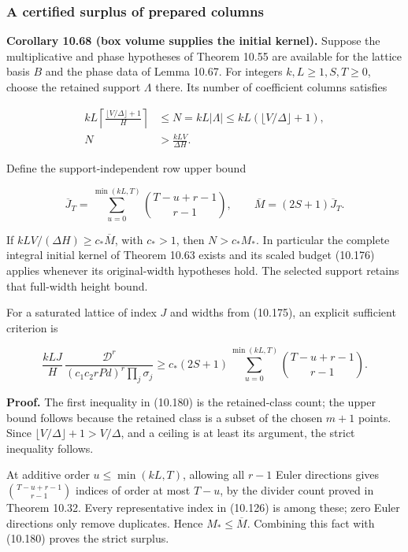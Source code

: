 \documentclass[
  11pt,
  a4paper,
]{article}
\begin{document}
\subsubsection{A certified surplus of prepared
columns}\label{a-certified-surplus-of-prepared-columns}

\textbf{Corollary 10.68 (box volume supplies the initial kernel).}
Suppose the multiplicative and phase hypotheses of Theorem 10.55 are
available for the lattice basis \(B\) and the phase data of Lemma 10.67.
For integers \(k,L\ge1,S,T\ge0\), choose the retained support
\(\Lambda\) there. Its number of coefficient columns satisfies

\[
\begin{aligned}
kL\left\lceil\frac{\lfloor V/\Delta\rfloor+1}{H}\right\rceil
&\le N=kL|\Lambda|\le kL(\lfloor V/\Delta\rfloor+1),\\
N&>\frac{kLV}{\Delta H}.
\end{aligned}
\tag{10.180}
\]

Define the support-independent row upper bound

\[
\overline J_T=\sum_{u=0}^{\min(kL,T)}
\binom{T-u+r-1}{r-1},\qquad
\overline M=(2S+1)\overline J_T.
\tag{10.181}
\]

If \(kLV/(\Delta H)\ge c_*\overline M\), with \(c_*>1\), then
\(N>c_*M_*\). In particular the complete integral initial kernel of
Theorem 10.63 exists and its scaled budget (10.176) applies whenever its
original-width hypotheses hold. The selected support retains that
full-width height bound.

For a saturated lattice of index \(J\) and widths from (10.175), an
explicit sufficient criterion is

\[
\frac{kLJ}{H}\,
\frac{\mathcal D^r}
{(c_1c_2rPd)^r\prod_j\sigma_j}
\ge c_*(2S+1)
\sum_{u=0}^{\min(kL,T)}\binom{T-u+r-1}{r-1}.
\tag{10.182}
\]

\textbf{Proof.} The first inequality in (10.180) is the retained-class
count; the upper bound follows because the retained class is a subset of
the chosen \(m+1\) points. Since \(\lfloor V/\Delta\rfloor+1>V/\Delta\),
and a ceiling is at least its argument, the strict inequality follows.

At additive order \(u\le\min(kL,T)\), allowing all \(r-1\) Euler
directions gives \(\binom{T-u+r-1}{r-1}\) indices of order at most
\(T-u\), by the divider count proved in Theorem 10.32. Every
representative index in (10.126) is among these; zero Euler directions
only remove duplicates. Hence \(M_*\le\overline M\). Combining this fact
with (10.180) proves the strict surplus.
\end{document}

